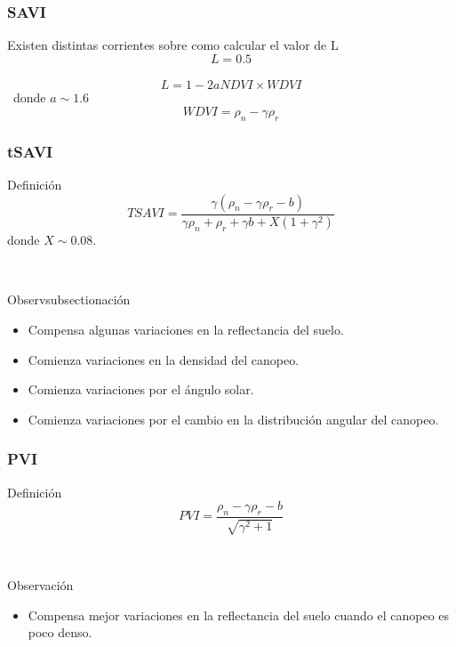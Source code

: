 \documentclass[handout]{beamer}
\begin{document}
\begin{frame}
    \frametitle{SAVI}
    Existen distintas corrientes sobre como calcular el valor de L
    \begin{equation}
        L=0.5
    \end{equation}\pause\
    \begin{equation}
        L = 1-2 a NDVI \times WDVI
    \end{equation}\pause\
    donde $a\sim 1.6$
    \begin{equation}
        WDVI = \rho_n -\gamma \rho_r
    \end{equation}
\end{frame}

\begin{frame}
    \frametitle{tSAVI}
    \begin{block}{Definición}
        \begin{equation}
            TSAVI =
            \frac{\gamma(\rho_n-\gamma\rho_r-b)}{\gamma\rho_n+\rho_r+\gamma b
            +X(1+\gamma^2)}
        \end{equation}
        donde $X\sim0.08$.
    \end{block}\pause\
    \begin{block}{Observsubsectionación}
        \begin{itemize}[<+->]
            \item Compensa algunas variaciones en la reflectancia del suelo.
            \item Comienza variaciones en la densidad del canopeo.
            \item Comienza variaciones por el ángulo solar.
            \item Comienza variaciones por el cambio en la distribución
                angular del canopeo.
        \end{itemize}
    \end{block}
\end{frame}

\begin{frame}
    \frametitle{PVI}
    \begin{block}{Definición}
        \begin{equation}
            PVI = \frac{\rho_n-\gamma\rho_r-b}{\sqrt{\gamma^2+1}}
        \end{equation}
    \end{block}\pause\
    \begin{block}{Observación}
        \begin{itemize}
            \item Compensa mejor variaciones en la reflectancia del suelo cuando
                el canopeo es poco denso.
        \end{itemize}
    \end{block}
\end{frame}
\end{document}
